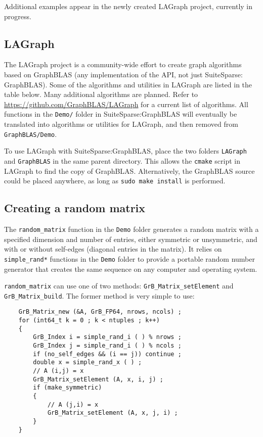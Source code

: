 \documentclass[12pt]{article}
\begin{document}
Additional examples appear in the newly created LAGraph project, currently in
progress.

\subsection{LAGraph}
\label{lagraph}

The LAGraph project is a community-wide effort to create graph algorithms based
on GraphBLAS (any implementation of the API, not just SuiteSparse: GraphBLAS).
Some of the algorithms and utilities in LAGraph are listed in the table below.
Many additional algorithms are planned.  Refer to
\url{https://github.com/GraphBLAS/LAGraph} for a current list of algorithms. All
functions in the \verb'Demo/' folder in SuiteSparse:GraphBLAS will eventually
be translated into algorithms or utilities for LAGraph, and then removed
from \verb'GraphBLAS/Demo'.

To use LAGraph with SuiteSparse:GraphBLAS, place the two folders \verb'LAGraph'
and \verb'GraphBLAS' in the same parent directory.  This allows the
\verb'cmake' script in LAGraph to find the copy of GraphBLAS.  Alternatively,
the GraphBLAS source could be placed anywhere, as long as
\verb'sudo make install' is performed.

\subsection{Creating a random matrix}
\label{random}

The \verb'random_matrix' function in the \verb'Demo' folder generates a random
matrix with a specified dimension and number of entries, either symmetric or
unsymmetric, and with or without self-edges (diagonal entries in the matrix).
It relies on \verb'simple_rand*' functions in the \verb'Demo' folder to provide
a portable random number generator that creates the same sequence on any
computer and operating system.

\verb'random_matrix' can use one of two methods: \verb'GrB_Matrix_setElement'
and \verb'GrB_Matrix_build'.  The former method is very simple to use:

    {\footnotesize
    \begin{verbatim}
    GrB_Matrix_new (&A, GrB_FP64, nrows, ncols) ;
    for (int64_t k = 0 ; k < ntuples ; k++)
    {
        GrB_Index i = simple_rand_i ( ) % nrows ;
        GrB_Index j = simple_rand_i ( ) % ncols ;
        if (no_self_edges && (i == j)) continue ;
        double x = simple_rand_x ( ) ;
        // A (i,j) = x
        GrB_Matrix_setElement (A, x, i, j) ;
        if (make_symmetric)
        {
            // A (j,i) = x
            GrB_Matrix_setElement (A, x, j, i) ;
        }
    } \end{verbatim}}
\end{document}
